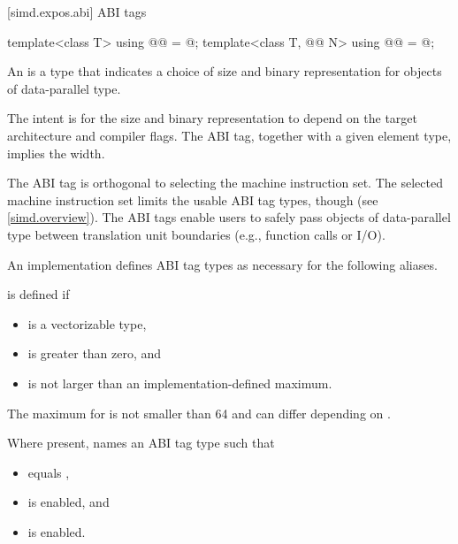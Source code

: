 [simd.expos.abi]{ ABI tags}

\begin{itemdecl}
template<class T> using @@ = @\seebelow@;
template<class T, @@ N> using @@ = @\seebelow@;
\end{itemdecl}

\begin{itemdescr}
\pnum
An  is a type that indicates a choice of size and binary
representation for objects of data-parallel type.
\begin{note}
The intent is for the size and binary representation to depend on the target
architecture and compiler flags.
The ABI tag, together with a given element type, implies the width.
\end{note}

\pnum
\begin{note}
The ABI tag is orthogonal to selecting the machine instruction set.
The selected machine instruction set limits the usable ABI tag types, though
(see \ref{simd.overview}).
The ABI tags enable users to safely pass objects of data-parallel type between
translation unit boundaries (e.g., function calls or I/O).
\end{note}

\pnum
An implementation defines ABI tag types as necessary for the following aliases.

\pnum
{} is defined if
\begin{itemize}
\item {} is a vectorizable type,
\item {} is greater than zero, and
\item {} is not larger than an implementation-defined maximum.
\end{itemize}
The  maximum for
 is not smaller than 64 and can differ depending on .

\pnum
Where present,  names an ABI tag type such
that
\begin{itemize}
 \item
    equals
   , \item {} is
   enabled, and
 \item
    is enabled.
\end{itemize}


\end{itemdescr}
